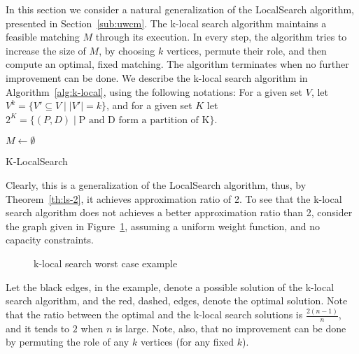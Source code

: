 \label{apx:k-local}
In this section we consider a natural generalization of the LocalSearch 
algorithm, presented in Section~\ref{sub:uwcm}.
The k-local search algorithm maintains a feasible matching $M$ through its execution.
In every step,
the algorithm tries to increase the size of $M$, 
by choosing $k$ vertices, permute their role,
and then compute an optimal, fixed matching.
The algorithm terminates when no further improvement can be done.
We describe the k-local search algorithm in Algorithm~\ref{alg:k-local}, 
using the following notations: 
For a given set $V$, let $V^k = \{V' \subseteq V \mid |V'| = k\}$, 
and for a given set $K$ let $2^K = \{(P, D) \mid \text{P and D form a partition of K}\}$. 


\begin{algorithm}
$M \leftarrow \emptyset$					\\

\caption{
\label{alg:k-local}
K-LocalSearch}
\end{algorithm}

Clearly, this is a generalization of the LocalSearch algorithm, thus, 
by Theorem~\ref{th:ls-2}, it achieves approximation ratio of 2.
To see that the k-local search algorithm does not achieves a better approximation ratio than 2, 
consider the graph given in Figure~\ref{fig:k-local-tight},
assuming a uniform weight function,  
and no capacity constraints.

\begin{figure}
\centering

\caption{
\label{fig:k-local-tight}
k-local search worst case example
}
\end{figure}

Let the black edges, in the example, 
denote a possible solution of the k-local search algorithm, 
and the red, dashed, edges, denote the optimal solution.
Note that the ratio between the optimal and the k-local search solutions is 
$\frac{2(n-1)}{n}$, and it tends to $2$ when $n$ is large.
Note, also, 
that no improvement can be done by permuting the role of any $k$ vertices (for any fixed $k$).

